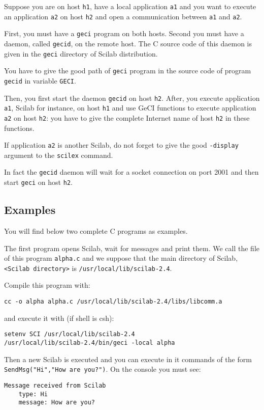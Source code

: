 \documentclass[11pt]{article}
\newcommand{\T}[1]{\texttt{#1}}
\begin{document}
Suppose you are on host \T{h1}, have a local application \T{a1} and
you want to execute an application \T{a2} on host \T{h2} and open a
communication between \T{a1} and \T{a2}.

First, you must have a \T{geci} program on both hosts. Second you must
have a daemon, called \T{gecid}, on the remote host. The C source code
of this daemon is given in the \T{geci} directory of Scilab
distribution.

You have to give the good path of \T{geci} program in the source code
of program \T{gecid} in variable \T{GECI}.

Then, you first start the daemon \T{gecid} on host \T{h2}. 
After, you execute application \T{a1}, Scilab for instance, on host
\T{h1} and use GeCI functions to execute application \T{a2} on host \T{h2}:
you have to give the complete Internet name of host \T{h2} in these
functions.

If application \T{a2} is another Scilab, do not forget to give the
good \T{-display} argument to the \T{scilex} command.

In fact the \T{gecid} daemon will wait for a socket connection on port
2001 and then start \T{geci} on host \T{h2}.

\subsection{Examples}\label{examples}

You will find below two complete C programs as examples.

The first program opens Scilab,
wait for messages and print them. We call the file of this program 
\T{alpha.c}
and we suppose that the main directory of Scilab, 
\verb|<Scilab directory>| is \T{/usr/local/lib/scilab-2.4}.

Compile this program with:
 
\begin{verbatim}
cc -o alpha alpha.c /usr/local/lib/scilab-2.4/libs/libcomm.a
\end{verbatim}

and execute it with (if shell is csh):

\begin{verbatim}
setenv SCI /usr/local/lib/scilab-2.4
/usr/local/lib/scilab-2.4/bin/geci -local alpha
\end{verbatim} 

Then a new Scilab is executed and you can execute in it commands of the form
\T{SendMsg("Hi","How are you?")}. On the console you must see:
\begin{verbatim}
Message received from Scilab
    type: Hi
    message: How are you?
\end{verbatim}
\end{document}
